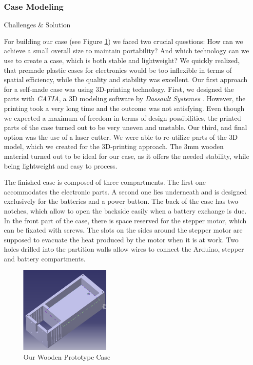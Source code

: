 \documentclass{sigchi}
\begin{document}
\subsubsection{Case Modeling}
Challenges \& Solution

For building our case (see Figure \ref{fig:Case}) we faced two crucial questions: How can we achieve a small overall size to maintain portability? And which technology can we use to create a case, which is both stable and lightweight? 
We quickly realized, that premade plastic cases for electronics would be too inflexible in terms of spatial efficiency, while the quality and stability was excellent. Our first approach for a self-made case was using 3D-printing technology. First, we designed the parts with \textit{CATIA}, a 3D modeling software by \textit{Dassault Systemes} \cite{dassault}. However, the printing took a very long time and the outcome was not satisfying. Even though we expected a maximum of freedom in terms of design possibilities, the printed parts of the case turned out to be very uneven and unstable. 
Our third, and final option was the use of a laser cutter. We were able to re-utilize parts of the 3D model, which we created for the 3D-printing approach. The 3mm wooden material turned out to be ideal for our case, as it offers the needed stability, while being lightweight and easy to process. 

The finished case is composed of three compartments. The first one accommodates the electronic parts. 
A second one lies underneath and is designed exclusively for the batteries and a power button. The back of the case has two notches, which allow to open the backside easily when a battery exchange is due. In the front part of the case, there is space reserved for the stepper motor, which can be fixated with screws. The slots on the sides around the stepper motor are supposed to evacuate the heat produced by the motor when it is at work. Two holes drilled into the partition walls allow wires to connect the Arduino, stepper and battery compartments.

\begin{figure}
 	\center
 	\includegraphics[width=0.4\textwidth]{case.png}
	\caption{Our Wooden Prototype Case}
	\label{fig:Case}
\end{figure} 
\end{document}
